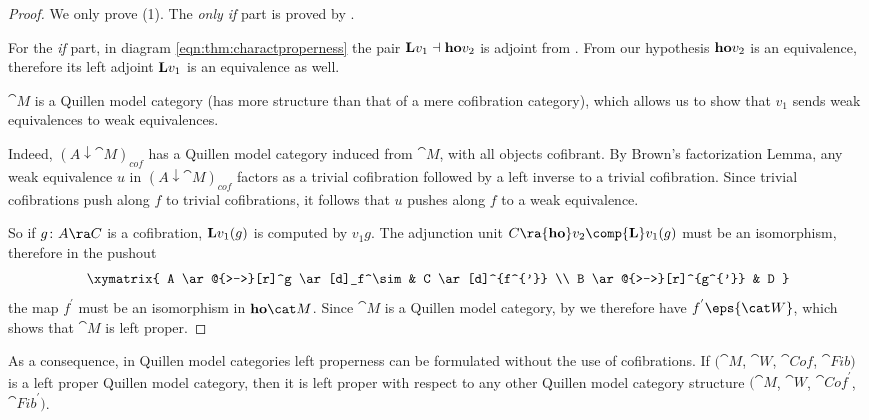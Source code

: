 \begin{proof}
We only prove (1). The {\it only if} part is proved by . 

For the {\it if} part, in diagram \eqref{eqn:thm:charactproperness} the pair ${\bf L} v_1 \dashv {\bf ho} v_2$ is adjoint from . From our hypothesis ${\bf ho} v_2$ is an equivalence, therefore its left adjoint ${\bf L} v_1$ is an equivalence as well.

${\cat M}$ is a Quillen model category (has more structure than that of a mere cofibration category), which allows us to show that $v_1$ sends weak equivalences to weak equivalences. 

Indeed, $(A \downarrow {\cat M})_{cof}$ has a Quillen model category induced from ${\cat M}$, with all objects cofibrant. By Brown's factorization Lemma, any weak equivalence $u$ in $(A \downarrow {\cat M})_{cof}$ factors as a trivial cofibration followed by a left inverse to a trivial cofibration. Since trivial cofibrations push along $f$ to trivial cofibrations, it follows that $u$ pushes along $f$ to a weak equivalence.

So if $g \colon A \ra C$ is a cofibration, ${\bf L}v_1(g)$ is computed by $v_1g$. The adjunction unit $C \ra {\bf ho} v_2 \comp {\bf L}v_1(g)$ must be an isomorphism, therefore in the pushout
\[
\xymatrix{
  A \ar@{>->}[r]^g \ar[d]_f^\sim & C \ar[d]^{f^{'}} \\
  B \ar@{>->}[r]^{g^{'}} & D
}
\]
the map $f^{'}$ must be an isomorphism in ${\bf ho}{\cat M}$. Since ${\cat M}$ is a Quillen model category, by  we therefore have $f^{'} \eps {\cat W}$, which shows that ${\cat M}$ is left proper.
\end{proof}

As a consequence, in Quillen model categories left properness can be formulated without the use of cofibrations. If $({\cat M}$, ${\cat W}$, ${\cat Cof}$, ${\cat Fib})$ is a left proper Quillen model category, then it is left proper with respect to any other Quillen model category structure $({\cat M}$, ${\cat W}$, ${\cat Cof}^{'}$, ${\cat Fib}^{'})$.